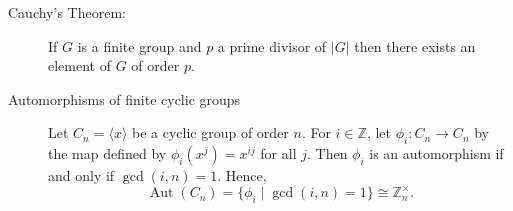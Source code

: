 \documentclass[12pt]{article}
\begin{document}
\begin{description}
\item[Cauchy's Theorem:]  If $G$ is a finite group and $p$ a prime divisor of $|G|$ then there exists an element of $G$ of order $p$.  

\item[Automorphisms of finite cyclic groups] Let $C_n=\langle x \rangle$ be a cyclic group of order $n$.  For $i\in \mathbb Z$, let $\phi_i:C_n\to C_n$ by the map defined by $\phi_i(x^j)=x^{ij}$ for all $j$.  Then $\phi_i$ is an automorphism if and only if $\gcd(i,n)=1$.  Hence, 
$$\operatorname{Aut}(C_n)=\{\phi_i\mid \gcd(i,n)=1\}\cong \mathbb Z_n^{\times}.$$



\end{description}
\end{document}
